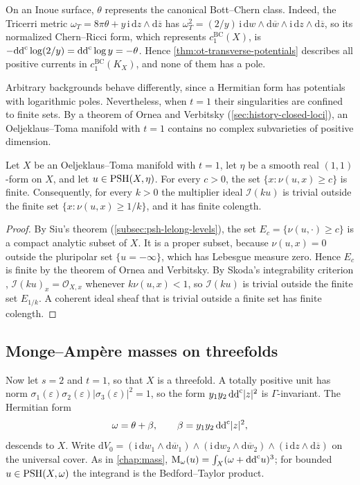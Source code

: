 On an Inoue surface, $\theta$ represents the canonical Bott--Chern class. Indeed, the Tricerri metric $\omega_T=8\pi\theta+y\,\mathrm i\,\mathrm dz\wedge\mathrm d\overline z$ has $\omega_T^2=(2/y)\,\mathrm i\,\mathrm dw\wedge\mathrm d\overline w\wedge\mathrm i\,\mathrm dz\wedge\mathrm d\overline z$, so its normalized Chern--Ricci form, which represents $c_1^{\mathrm{BC}}(X)$, is $-\mathrm{dd}^{\mathrm{c}}\log(2/y)=\mathrm{dd}^{\mathrm{c}}\log y=-\theta$. Hence \cref{thm:ot-transverse-potentials} describes all positive currents in $c_1^{\mathrm{BC}}(K_X)$, and none of them has a pole.

Arbitrary backgrounds behave differently, since a Hermitian form has potentials with logarithmic poles. Nevertheless, when $t=1$ their singularities are confined to finite sets. By a theorem of Ornea and Verbitsky (\cref{sec:history-closed-loci}), an Oeljeklaus--Toma manifold with $t=1$ contains no complex subvarieties of positive dimension.

\begin{corollary}\label{cor:ot-finite-lelong}
Let $X$ be an Oeljeklaus--Toma manifold with $t=1$, let $\eta$ be a smooth real $(1,1)$-form on $X$, and let $u\in\mathrm{PSH}(X,\eta)$. For every $c>0$, the set $\{x:\nu(u,x)\geq c\}$ is finite. Consequently, for every $k>0$ the multiplier ideal $\mathcal I(ku)$ is trivial outside the finite set $\{x:\nu(u,x)\geq1/k\}$, and it has finite colength.
\end{corollary}
\begin{proof}
By Siu's theorem (\cref{subsec:psh-lelong-levels}), the set $E_c=\{\nu(u,\cdot)\geq c\}$ is a compact analytic subset of $X$. It is a proper subset, because $\nu(u,x)=0$ outside the pluripolar set $\{u=-\infty\}$, which has Lebesgue measure zero. Hence $E_c$ is finite by the theorem of Ornea and Verbitsky. By Skoda's integrability criterion \cite[Lemma~5.6]{DemAM11}, $\mathcal I(ku)_x=\mathcal O_{X,x}$ whenever $k\nu(u,x)<1$, so $\mathcal I(ku)$ is trivial outside the finite set $E_{1/k}$. A coherent ideal sheaf that is trivial outside a finite set has finite colength.
\end{proof}

\subsection{Monge--Amp\`ere masses on threefolds}

Now let $s=2$ and $t=1$, so that $X$ is a threefold. A totally positive unit has norm $\sigma_1(\varepsilon)\sigma_2(\varepsilon)|\sigma_3(\varepsilon)|^2=1$, so the form $y_1y_2\,\mathrm{dd}^{\mathrm{c}}|z|^2$ is $\Gamma$-invariant. The Hermitian form
\[
 \omega=\theta+\beta,\qquad \beta=y_1y_2\,\mathrm{dd}^{\mathrm{c}}|z|^2,
\]
descends to $X$. Write $\mathrm dV_0=(\mathrm i\,\mathrm dw_1\wedge\mathrm d\overline w_1)\wedge(\mathrm i\,\mathrm dw_2\wedge\mathrm d\overline w_2)\wedge(\mathrm i\,\mathrm dz\wedge\mathrm d\overline z)$ on the universal cover. As in \cref{chap:mass}, $\mathrm M_\omega(u)=\int_X(\omega+\mathrm{dd}^{\mathrm{c}} u)^3$; for bounded $u\in\mathrm{PSH}(X,\omega)$ the integrand is the Bedford--Taylor product.

